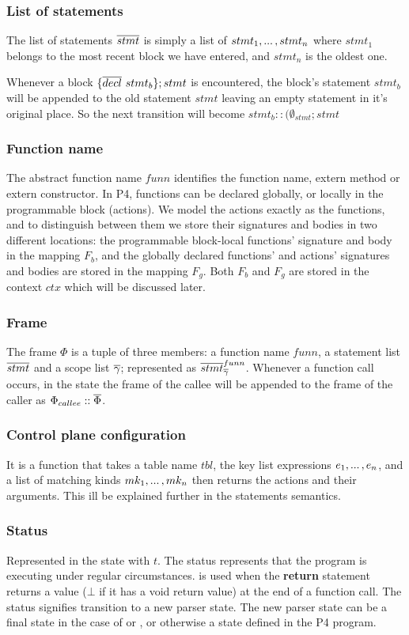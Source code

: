 \documentclass[UTF8]{article}
\begin{document}
\subsubsection*{List of statements}
The list of statements $\overline{stmt}$ is simply a list of $stmt_1 , ... \, , stmt_n$ where $stmt_1$ belongs to the most recent block we have entered, and $stmt_n$ is the oldest one.

Whenever a block $\{ \overline{decl} \ stmt_b \} ; stmt$ is encountered, the block's statement $stmt_b$ will be appended to the old statement $stmt$ leaving an empty statement in it's original place. So the next transition will become $stmt_b::(\emptyset_{stmt}; stmt$ 


\subsubsection*{Function name}
The abstract function name $funn$ identifies the function name, extern method or extern constructor. In P4, functions can be declared globally, or locally in the programmable block (actions). We model the actions exactly as the functions, and to distinguish between them we store their signatures and bodies in two different locations: the programmable block-local functions' signature and body in the mapping $F_b$, and the globally declared functions' and actions' signatures and bodies are stored in the mapping $F_g$. Both $F_b$ and $F_g$ are stored in the context $ctx$ which will be discussed later.


\subsubsection*{Frame}
The frame $\Phi$ is a tuple of three members: a function name $funn$, a statement list $\overline{stmt}$ and a scope list $\overline{\gamma}$; represented as $ \overline{stmt}^{funn}_{\overline{\gamma}{}} $. Whenever a function call occurs, in the state the frame of the callee will be appended to the frame of the caller as $\Phi_{callee} :: \overline{\Phi} $.


\subsubsection*{Control plane configuration}
It is a function that takes a table name $tbl$, the key list expressions $e_1 , ... \, , e_n$, and a list of matching kinds $mk_1 , ... \, , mk_n$ then returns the actions and their arguments. This ill be explained further in the statements semantics.

\subsubsection*{Status}
Represented in the state with $t$. The status \running{} represents that the program is executing under regular circumstances.  is used when the \textbf{return} statement returns a value \cval{} ($\bot$ if it has a void return value) at the end of a function call. The status \trans{\vn{}} signifies transition to a new parser state. The new parser state can be a final state in the case of  or , or otherwise a state defined in the P4 program.
\end{document}
